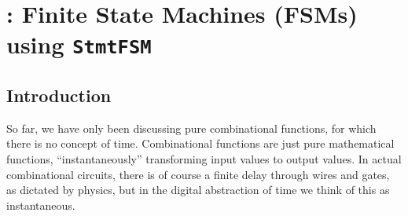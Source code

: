 

\chapter{{\BSV}: Finite State Machines (FSMs) using {\tt StmtFSM}}


\setcounter{page}{1}
\renewcommand{\thepage}{\arabic{chapter}-\arabic{page}}

\label{ch_FSMs}


\section{Introduction}


So far, we have only been discussing pure combinational functions, for
which there is no concept of time.  Combinational functions are just
pure mathematical functions, ``instantaneously'' transforming input
values to output values.  In actual combinational circuits, there is
of course a finite delay through wires and gates, as dictated by
physics, but in the digital abstraction of time we think of this as
instantaneous.

